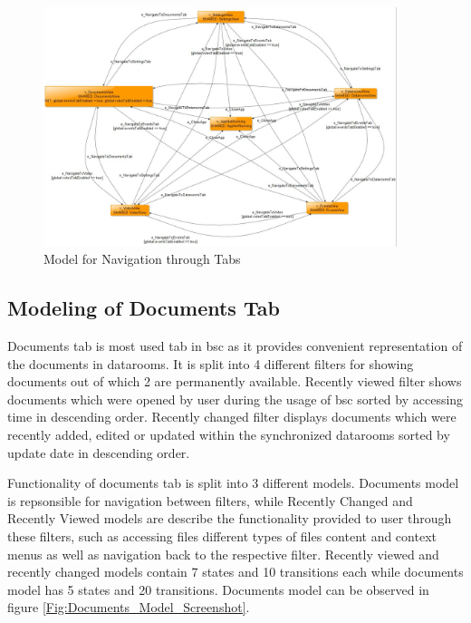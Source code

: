 \begin{figure} [htbp!]
	\centering
					\includegraphics[width=0.92\textwidth]{figures/Navigation_model_screenshot}
					\caption{\label{Fig:Navigation_Model_Screenshot} Model for Navigation through Tabs}
\end{figure}

\subsection{Modeling of Documents Tab}
\par
Documents tab is most used tab in \acrshort{bsc} as it provides convenient representation of the documents in datarooms. It is split into 4 different filters for showing documents out of which 2 are permanently available. Recently viewed filter shows documents which were opened by user during the usage of \acrshort{bsc} sorted by accessing time in descending order. Recently changed filter displays documents which were recently added, edited or updated within the synchronized datarooms sorted by update date in descending order.

\par
Functionality of documents tab is split into 3 different models. Documents model is repsonsible for navigation between filters, while Recently Changed and Recently Viewed models are describe the functionality provided to user through these filters, such as accessing files different types of files content and context menus as well as navigation back to the respective filter. Recently viewed and recently changed models contain 7 states and 10 transitions each while documents model has 5 states and 20 transitions. Documents model can be observed in figure \ref{Fig:Documents_Model_Screenshot}. 

